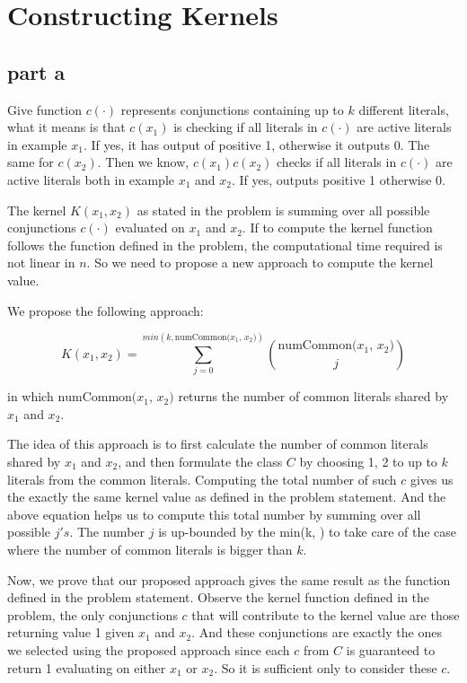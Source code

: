 \section{Constructing Kernels}

\subsection{part a}

Give function $c(\cdot)$ represents conjunctions containing up to $k$ different literals, what it means is that $c(x_1)$ is checking if all literals in $c(\cdot)$ are active literals in example $x_1$. If yes, it has output of positive 1, otherwise it outputs 0. The same for $c(x_2)$. Then we know, $c(x_1)c(x_2)$ checks if all literals in $c(\cdot)$ are active literals both in example $x_1$ and $x_2$. If yes, outputs positive 1 otherwise 0.

The kernel $K(x_1, x_2)$ as stated in the problem is summing over all possible conjunctions $c(\cdot)$ evaluated on $x_1$ and $x_2$. If to compute the kernel function follows the function defined in the problem, the computational time required is not linear in $n$. So we need to propose a new approach to compute the kernel value.

We propose the following approach:

\begin{equation}
K(x_1,x_2) = \sum_{j=0}^{min(k, \text{numCommon($x_1$, $x_2$)}) } {\text{numCommon($x_1$, $x_2$)} \choose j}
\end{equation}

in which $\text{numCommon($x_1$, $x_2$)}$ returns the number of common literals shared by $x_1$ and $x_2$.

The idea of this approach is to first calculate the number of common literals shared by $x_1$ and $x_2$, and then formulate the class $C$ by choosing 1, 2 to up to $k$ literals from the common literals. Computing the total number of such $c$ gives us the exactly the same kernel value as defined in the problem statement. And the above equation helps us to compute this total number by summing over all possible $j's$. The number $j$ is up-bounded by the min(k, ) to take care of the case where the number of common literals is bigger than $k$.

Now, we prove that our proposed approach gives the same result as the function defined in the problem statement. Observe the kernel function defined in the problem, the only conjunctions $c$ that will contribute to the kernel value are those returning value 1 given $x_1$ and $x_2$. And these conjunctions are exactly the ones we selected using the proposed approach since each $c$ from $C$ is guaranteed to return 1 evaluating on either $x_1$ or $x_2$. So it is sufficient only to consider these $c$.


